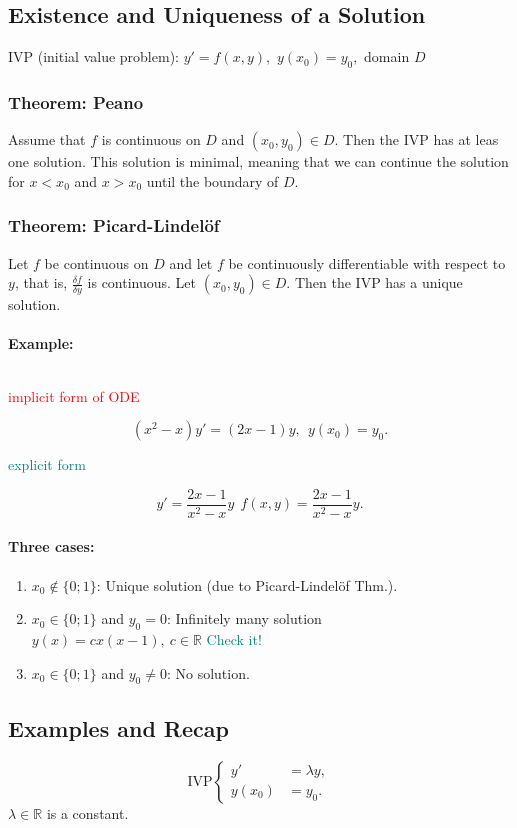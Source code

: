 \documentclass[]{article}
\begin{document}
	\subsection{Existence and Uniqueness of a Solution}
	IVP (initial value problem): $y'=f(x,y),$ $y(x_0)=y_0,$ domain $D$
	\subsubsection{Theorem:  Peano} Assume that $f$ is continuous on $D$ and $(x_0,y_0)\in D$. Then the IVP has at leas one solution. This solution is minimal, meaning that we can continue the solution for $x <x_0$ and $x > x_0$ until the boundary of $D$.
	\subsubsection{Theorem: Picard-Lindelöf} Let $f$ be continuous on $D$ and let $f$ be continuously differentiable with respect to $y$, that is, $ \frac{\delta f}{\delta y} $ is continuous. Let $(x_0,y_0)\in D$. Then the IVP has a unique solution.
	\paragraph{Example:}$~$ 
	\begin{multicols}{2}
	\begin{center}
	\textcolor{red}{implicit form of ODE}
	\end{center}
	\[
		(x ^{2}-x)y'=(2x-1)y,~~y(x_0)=y_0
	.\]
	\begin{center}
	\textcolor{teal}{explicit form}
	\end{center}
	\[
	y'= \frac{2x-1}{x ^{2}-x}y~~f(x,y)= \frac{2x-1}{x ^{2}-x}y
	.\]
	\end{multicols}
	\paragraph{Three cases:} 
	\begin{enumerate}
		\item $x_0\not\in \{0;1\}$: Unique solution (due to Picard-Lindelöf Thm.).
		\item $x_0\in \{0;1\}$ and $y_0=0$: Infinitely many solution\\$y(x)=cx(x-1),~c\in \mathbb R$ \textcolor{teal}{ Check it!}
		\item $x_0\in \{0;1\}$ and $y_0\not=0$: No solution.
	\end{enumerate}
\subsection{Examples and Recap}
\[
	\text{IVP}
	\begin{cases} 
		y' & =\lambda y, \\
		y(x_0) & =y_0.
	\end{cases}
\]
	$\lambda\in \mathbb R$ is a constant.
\end{document}
